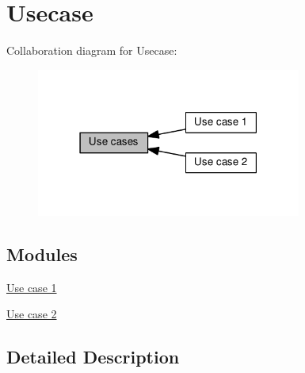 \hypertarget{group__usecase}{}\section{Usecase}
\label{group__usecase}
Collaboration diagram for Usecase\+:\nopagebreak
\begin{figure}[H]
\begin{center}
\leavevmode
\includegraphics[width=247pt]{group__usecase}
\end{center}
\end{figure}
\subsection*{Modules}
\begin{DoxyCompactItemize}
\item 
\hyperlink{group__usecase1}{Use case 1}
\item 
\hyperlink{group__usecase2}{Use case 2}
\end{DoxyCompactItemize}


\subsection{Detailed Description}
